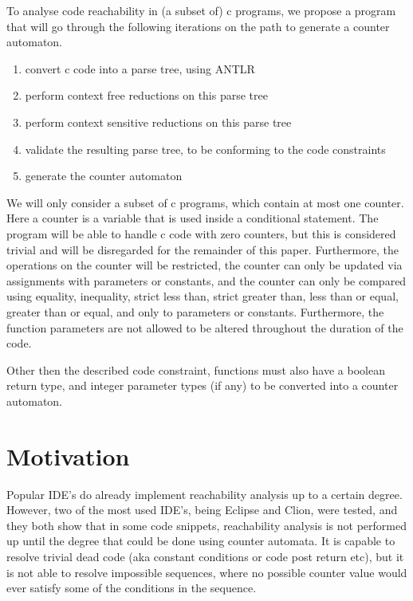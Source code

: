 \documentclass[12pt]{article}
\begin{document}
To analyse code reachability in (a subset of) c programs, we propose a program that will go through the following iterations on the path to generate a counter automaton.

\begin{enumerate}
	\item convert c code into a parse tree, using ANTLR
	\item perform context free reductions on this parse tree
	\item perform context sensitive reductions on this parse tree
	\item validate the resulting parse tree, to be conforming to the code constraints
	\item generate the counter automaton
\end{enumerate}

We will only consider a subset of c programs, which contain at most one counter. Here a counter is a variable that is used inside a conditional statement. The program will be able to handle c code with zero counters, but this is considered trivial and will be disregarded for the remainder of this paper. Furthermore, the operations on the counter will be restricted, the counter can only be updated via assignments with parameters or constants, and the counter can only be compared using equality, inequality, strict less than, strict greater than, less than or equal, greater than or equal, and only to parameters or constants. Furthermore, the function parameters are not allowed to be altered throughout the duration of the code.

Other then the described code constraint, functions must also have a boolean return type, and integer parameter types (if any) to be converted into a counter automaton.

\section{Motivation}
Popular IDE's do already implement reachability analysis up to a certain degree. However, two of the most used IDE's, being Eclipse and Clion, were tested, and they both show that in some code snippets, reachability analysis is not performed up until the degree that could be done using counter automata. It is capable to resolve trivial dead code (aka constant conditions or code post return etc), but it is not able to resolve impossible sequences, where no possible counter value would ever satisfy some of the conditions in the sequence.
\end{document}
